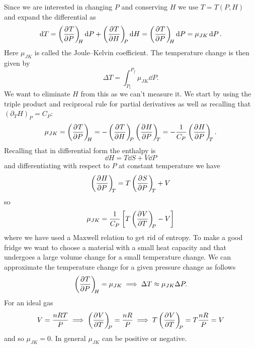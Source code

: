 \documentclass[a4paper]{article}
\begin{document}
    Since we are interested in changing \(P\) and conserving \(H\) we use \(T = T(P, H)\) and expand the differential as
    \[\dd{T} = \left(\pdv[]{T}{P}\right)_{\!\!{H}}\dd{P} + \left(\pdv[]{T}{H}\right)_{\!\!{P}}\dd{H} = \left(\pdv[]{T}{P}\right)_{\!\!{H}}\dd{P} = \mu_{JK}\dd{P}.\]
    Here \(\mu_{JK}\) is called the Joule--Kelvin coefficient.
    The temperature change is then given by
    \[\Delta T = \int_{P_i}^{P_f}\mu_{JK}\dd{P}.\]
    We want to eliminate \(H\) from this as we can't measure it.
    We start by using the triple product and reciprocal rule for partial derivatives as well as recalling that \((\partial_TH)_P = C_P\):
    \[\mu_{JK} = \pdvconst{T}{P}{H} = -\pdvconst{T}{H}{P}\pdvconst{H}{P}{T} = -\frac{1}{C_P}\pdvconst{H}{P}{T}.\]
    Recalling that in differential form the enthalpy is
    \[\dd{H} = T\dd{S} + V\dd{P}\]
    and differentiating with respect to \(P\) at constant temperature we have
    \[\left(\pdv[]{H}{P}\right)_{\!\!{T}} = T\left(\pdv[]{S}{P}\right)_{\!\!{T}} + V\]
    so
    \[\mu_{JK} = \frac{1}{C_P}\left[T\left(\pdv[]{V}{T}\right)_{\!\!{P}} - V\right]\]
    where we have used a Maxwell relation to get rid of entropy.
    To make a good fridge we want to choose a material with a small heat capacity and that undergoes a large volume change for a small temperature change.
    We can approximate the temperature change for a given pressure change as follows
    \[\left(\pdv[]{T}{P}\right)_{\!\!{H}} = \mu_{JK} \implies \Delta T \approx \mu_{JK}\Delta P.\]
    For an ideal gas
    \[V = \frac{nRT}{P} \implies \left(\pdv[]{V}{T}\right)_{\!\!{P}} = \frac{nR}{P} \implies T\left(\pdv[]{V}{T}\right)_{\!\!{P}} = T\frac{nR}{P} = V\]
    and so \(\mu_{JK} = 0\).
    In general \(\mu_{JK}\) can be positive or negative.
    
\end{document}
